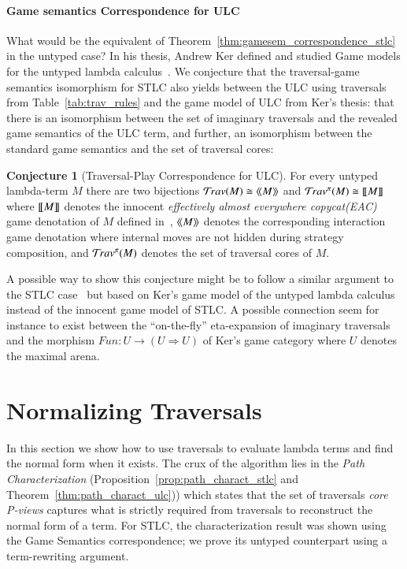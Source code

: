 \documentclass{elsarticle}
\theoremstyle{plain}
\theoremstyle{definition}
\newtheorem{conjecture}{Conjecture}[section]
\theoremstyle{remark}
\newcommand{\travulc}{\travset}
\def\coresymbol{\pi} %
\begin{document}
\paragraph{Game semantics Correspondence for ULC}
What would be the equivalent of Theorem~\ref{thm:gamesem_correspondence_stlc} in the untyped case? In his thesis, Andrew Ker defined and studied Game models for the untyped lambda calculus~\cite{KerThesis}.  We conjecture that the traversal-game semantics isomorphism for STLC also yields between the ULC using traversals from Table~\ref{tab:trav_rules} and the game model of ULC from Ker's thesis: that there is an isomorphism between the set of imaginary traversals and the revealed game semantics of the ULC term, and further, an isomorphism between the standard game semantics and the set of traversal cores:

\begin{conjecture}[Traversal-Play Correspondence for ULC]
\label{conj:ulc_corresp}
For every untyped lambda-term $M$ there are two bijections
$ \travulc(M) \cong \revsem{M}$ and
 $\travulc^\coresymbol(M) \cong \sem{M}$
where ${[\![ M ]\!]}$ denotes the innocent \emph{effectively almost everywhere copycat(EAC)} game denotation of $M$ defined in~\cite{KerThesis},
${\langle\!\langle M \rangle\!\rangle}$ denotes the corresponding interaction game denotation where internal moves are not hidden during strategy composition,
and $\travulc^\coresymbol(M)$ denotes the set of traversal cores of $M$.
\end{conjecture}
A possible way to show this conjecture might be to follow a similar argument to the STLC case~\cite{BlumPhd} but based on Ker's game model of the untyped lambda calculus instead of the innocent game model of STLC. A possible connection seem for instance to exist between the ``on-the-fly'' eta-expansion of imaginary traversals and  the morphism $Fun : U \rightarrow (U \Rightarrow U)$ of Ker's game category where $U$ denotes the maximal arena.

\section{Normalizing Traversals}

In this section we show how to use traversals to evaluate lambda terms and find the normal form when it exists. The crux of the algorithm lies in the \emph{Path Characterization} (Proposition~\ref{prop:path_charact_stlc} and Theorem~\ref{thm:path_charact_ulc})) which states that the set of traversals \emph{core P-views} captures what is strictly required from traversals to reconstruct the normal form of a term.
For STLC, the characterization result was shown using the Game Semantics correspondence; we prove its untyped counterpart using a term-rewriting argument.
\end{document}
